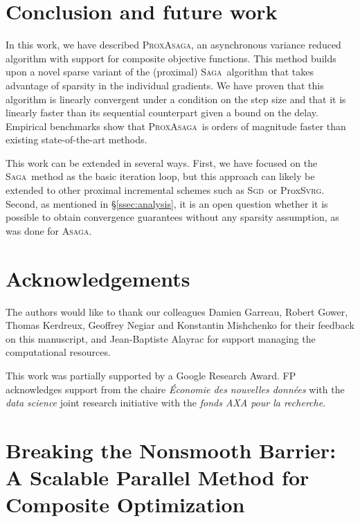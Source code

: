 \documentclass{article}
\newcommand{\PASAGA}{\textsc{ProxAsaga}}
\newcommand{\SAGA}{\textsc{Saga}}
\newcommand{\ASAGA}{\textsc{Asaga}}
\newcommand{\ProxSVRG}{Prox\textsc{Svrg}}
\newcommand{\SGD}{\textsc{Sgd}}
\begin{document}
\section{Conclusion and future work}
In this work, we have described \PASAGA, an asynchronous variance reduced algorithm with support for composite objective functions.
This method builds upon a novel sparse variant of the (proximal) \SAGA\ algorithm that takes advantage of sparsity in the individual gradients.
We have proven that this algorithm is linearly convergent under a condition on the step size and that it is linearly faster than its sequential counterpart given a bound on the delay.
%
Empirical benchmarks show that \PASAGA\ is orders of magnitude faster than existing state-of-the-art methods. %

This work can be extended in several ways.
First, we have focused on the \SAGA\ method as the basic iteration loop, but this approach can likely be extended to other proximal incremental schemes such as \SGD\ or \ProxSVRG.
Second, as mentioned in \S\ref{ssec:analysis}, it is an open question whether it is possible to obtain convergence guarantees without any sparsity assumption, as was done for \ASAGA.

\section*{Acknowledgements}

The authors would like to thank our colleagues Damien Garreau, Robert Gower, Thomas Kerdreux, Geoffrey Negiar and Konstantin Mishchenko for their feedback on this manuscript, and Jean-Baptiste Alayrac for support managing the computational resources.

This work was partially supported by a Google Research Award.
FP acknowledges support from the chaire \emph{\'Economie des nouvelles donn\'ees} with the \emph{data science} joint research initiative with the \emph{ fonds AXA pour la recherche}.



{}


%
\clearpage
\appendix
\gdef\thesection{Appendix \Alph{section}}

%
%
%

%
%
%
%
%

\section*{\centering\LARGE Breaking the Nonsmooth Barrier: A Scalable Parallel Method for Composite Optimization\\
\hfill\\
}
\end{document}
